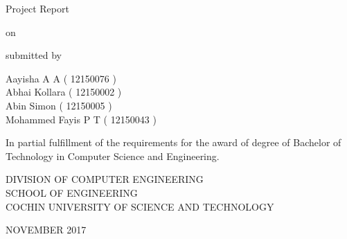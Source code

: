 \vspace*{\fill}

\begin{center}

\fontsize{14pt}{12pt}\selectfont
Project Report

\hspace{0.7em}

on

\hspace{0.7em}
\vspace{0.3in}

\fontsize{20pt}{12pt}

\hspace{1em}
\vspace{0.3in}

submitted by

\hspace{1em}
\vspace{0.3in}

\fontsize{14pt}{12pt}\selectfont
Aayisha A A ( 12150076 )\\
Abhai Kollara ( 12150002 )\\
Abin Simon ( 12150005 )\\
Mohammed Fayis P T ( 12150043 )

\hspace{1em}
\vspace{0.5in}

\normalsize
In partial fulfillment of the requirements for the award of degree of Bachelor of Technology in Computer Science and Engineering.

\hspace{1em}
\vspace{0.5in}

\fontsize{15pt}{12pt}\selectfont
DIVISION OF COMPUTER ENGINEERING\\
SCHOOL OF ENGINEERING\\
COCHIN UNIVERSITY OF SCIENCE AND TECHNOLOGY

\hspace{1em}

\normalsize
NOVEMBER 2017
\end{center}

\vspace*{\fill}